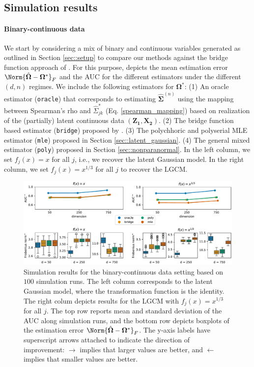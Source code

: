 \subsection{Simulation results}

\paragraph{Binary-continuous data}

We start by considering a mix of binary and continuous variables generated as outlined in Section \ref{sec::setup} to compare our methods against the bridge function approach of \cite{Fan17}. For this purpose,  depicts the mean estimation error $\Norm{\hat{\mathbf\Omega} - \mathbf\Omega^*}_F$ and the AUC for the different estimators under the different $(d,n)$ regimes. We include the following estimators for \(\mathbf\Omega^*\): (1) An oracle estimator (\texttt{oracle}) that corresponds to estimating $\hat{\mathbf\Sigma}^{(n)}$ using the mapping between Spearman's rho and \(\hat\Sigma_{jk}^*\) (Eq. \eqref{spearman_mapping}) based on realization of the (partially) latent continuous data $(\mathbf{Z_1},\mathbf{X_2})$. (2) The bridge function based estimator (\texttt{bridge}) proposed by \cite{Fan17}. (3) The polychhoric and polyserial MLE estimator (\texttt{mle}) proposed in Section \ref{sec::latent_gaussian}. (4) The general mixed estimator (\texttt{poly}) proposed in Section \ref{sec::nonparanormal}. In the left column, we set $f_j(x) = x$ for all $j$, i.e., we recover the latent Gaussian model. In the right column, we set $f_j(x) = x^{1/3}$ for all $j$ to recover the LGCM.


\begin{figure}
    \centering
    \includegraphics[width=\textwidth]{Figures/simulation_results_binary.pdf}
    \caption{Simulation results for the binary-continuous data setting based on \(100\) simulation runs. The left column corresponds to the latent Gaussian model, where the transformation function is the identity. The right colum depicts results for the LGCM with \(f_j(x) = x^{1/3}\) for all \(j\). The top row reports mean and standard deviation of the AUC along simulation runs, and the bottom row depicts boxplots of the estimation error $\Norm{\hat{\mathbf\Omega} - \mathbf\Omega^*}_F$. The y-axis labels have superscript arrows attached to indicate the direction of improvement: \(\rightarrow\) implies that larger values are better, and \(\leftarrow\) implies that smaller values are better.}
    \label{fig:bench_binary}
\end{figure}


